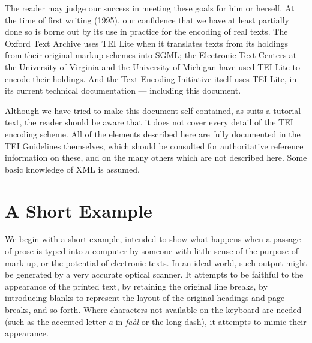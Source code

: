 \documentclass[11pt,twoside]{article}\makeatletter
\makeatletter
\renewcommand\section{\@startsection {section}{1}{\z@}%
     {-1.75ex \@plus -0.5ex \@minus -.2ex}%
     {0.5ex \@plus .2ex}%
     {\reset@font\Large\bfseries\sffamily}}
\def\DivI{\section}
\def\DivI{\chapter}
\makeatother
\begin{document}
The reader may judge our success in meeting these goals for him or herself. At the time of first writing (1995), our confidence that we have at least partially done so is borne out by its use in practice for the encoding of real texts.  The Oxford Text Archive uses TEI Lite when it translates texts from its holdings from their original markup schemes into SGML; the Electronic Text Centers at the University of Virginia and the University of Michigan have used TEI Lite to encode their holdings. And the Text Encoding Initiative itself uses TEI Lite, in its current technical documentation — including this document.        \par
Although we have tried to make this document self-contained, as suits a tutorial text, the reader should be aware that it does not cover every detail of the TEI encoding scheme. All of the elements described here are fully documented in the TEI Guidelines themselves, which should be consulted for authoritative reference information on these, and on the many others which are not described here.  Some basic knowledge of XML is assumed.
\DivI[A Short Example]{A Short Example}\label{U5-eg}\par
We begin with a short example, intended to show what happens when a passage of prose is typed into a computer by someone with little sense of the purpose of mark-up, or the potential of electronic texts. In an ideal world, such output might be generated by a very accurate optical scanner.  It attempts to be faithful to the appearance of the printed text, by retaining the original line breaks, by introducing blanks to represent the layout of the original headings and page breaks, and so forth. Where characters not available on the keyboard are needed (such as the accented letter \emph{a} in \emph{faàl} or the long dash), it attempts to mimic their appearance.\par
\end{document}
